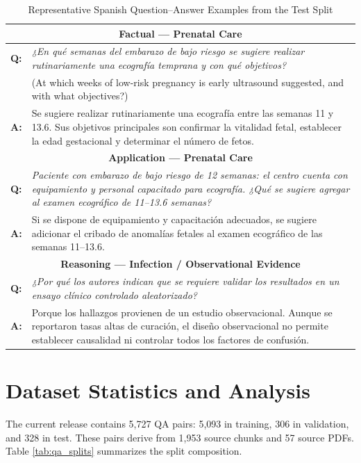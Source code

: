 \documentclass[conference]{IEEEtran}
\begin{document}
\begin{table}[t]
\caption{Representative Spanish Question--Answer Examples from the Test Split}
\label{tab:examples}
\centering
\scriptsize
\begin{tabular}{|p{}|p{}|}
\hline
\multicolumn{2}{|c|}{\textbf{Factual --- Prenatal Care}} \\
\hline
\textbf{Q:} & \textit{¿En qué semanas del embarazo de bajo riesgo se sugiere realizar rutinariamente una ecografía temprana y con qué objetivos?} \\
& (At which weeks of low-risk pregnancy is early ultrasound suggested, and with what objectives?) \\
\hline
\textbf{A:} & Se sugiere realizar rutinariamente una ecografía entre las semanas 11 y 13.6. Sus objetivos principales son confirmar la vitalidad fetal, establecer la edad gestacional y determinar el número de fetos. \\
\hline
\multicolumn{2}{|c|}{\textbf{Application --- Prenatal Care}} \\
\hline
\textbf{Q:} & \textit{Paciente con embarazo de bajo riesgo de 12 semanas: el centro cuenta con equipamiento y personal capacitado para ecografía. ¿Qué se sugiere agregar al examen ecográfico de 11--13.6 semanas?} \\
\hline
\textbf{A:} & Si se dispone de equipamiento y capacitación adecuados, se sugiere adicionar el cribado de anomalías fetales al examen ecográfico de las semanas 11--13.6. \\
\hline
\multicolumn{2}{|c|}{\textbf{Reasoning --- Infection / Observational Evidence}} \\
\hline
\textbf{Q:} & \textit{¿Por qué los autores indican que se requiere validar los resultados en un ensayo clínico controlado aleatorizado?} \\
\hline
\textbf{A:} & Porque los hallazgos provienen de un estudio observacional. Aunque se reportaron tasas altas de curación, el diseño observacional no permite establecer causalidad ni controlar todos los factores de confusión. \\
\hline
\end{tabular}
\end{table}

\section{Dataset Statistics and Analysis}
The current release contains 5,727 QA pairs: 5,093 in training, 306 in validation, and 328 in test. These pairs derive from 1,953 source chunks and 57 source PDFs. Table \ref{tab:qa_splits} summarizes the split composition.
\end{document}
